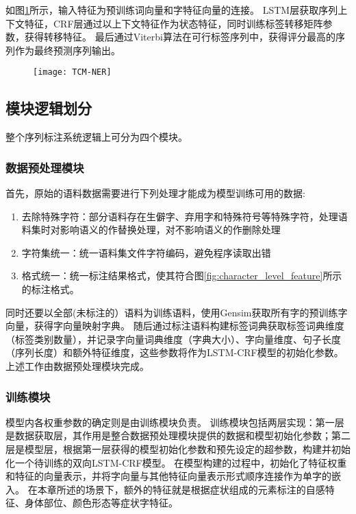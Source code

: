 如图\ref{fig:TCM_NER}所示，输入特征为预训练词向量和字特征向量的连接。
LSTM层获取序列上下文特征，CRF层通过以上下文特征作为状态特征，同时训练标签转移矩阵参数，获得转移特征。
最后通过Viterbi算法在可行标签序列中，获得评分最高的序列作为最终预测序列输出。

\begin{figure}[H]
    \centering
    \texttt{[image: TCM-NER]}
    \label{fig:TCM_NER}
\end{figure}

\subsection{模块逻辑划分}

整个序列标注系统逻辑上可分为四个模块。
\subsubsection{数据预处理模块}
首先，原始的语料数据需要进行下列处理才能成为模型训练可用的数据:
\begin{enumerate}
    \item 去除特殊字符：部分语料存在生僻字、弃用字和特殊符号等特殊字符，处理语料集时对影响语义的作替换处理，对不影响语义的作删除处理
    \item 字符集统一：统一语料集文件字符编码，避免程序读取出错
    \item 格式统一：统一标注结果格式，使其符合图\ref{fig:character_level_feature}所示的标注格式。
\end{enumerate}
同时还要以全部(未标注的）语料为训练语料，使用Gensim获取所有字的预训练字向量，获得字向量映射字典。
随后通过标注语料构建标签词典获取标签词典维度（标签类别数量），并记录字向量词典维度（字典大小）、字向量维度、句子长度（序列长度）和额外特征维度，这些参数将作为LSTM-CRF模型的初始化参数。
上述工作由数据预处理模块完成。
\subsubsection{训练模块}
模型内各权重参数的确定则是由训练模块负责。
训练模块包括两层实现：第一层是数据获取层，其作用是整合数据预处理模块提供的数据和模型初始化参数；第二层是模型层，根据第一层获得的模型初始化参数和预先设定的超参数，构建并初始化一个待训练的双向LSTM-CRF模型。
在模型构建的过程中，初始化了特征权重和特征的向量表示，并将字向量与其他特征向量表示形式顺序连接作为单字的嵌入。
在本章所述的场景下，额外的特征就是根据症状组成的元素标注的自感特征、身体部位、颜色形态等症状字特征。

